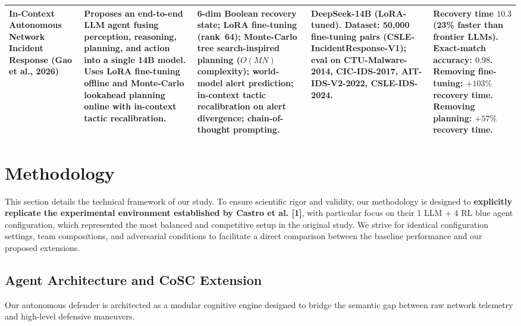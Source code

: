 \documentclass[letterpaper, 10 pt, conference]{ieeeconf}
\begin{document}
\begin{table}[!t]
{\begin{tabular}{|p{3.0cm}|p{4.2cm}|p{3.8cm}|p{3.8cm}|p{3.6cm}|}
    In-Context Autonomous Network Incident Response
    \newline (Gao et al., 2026)~\cite{arXiv:2602.13156}
    &
    Proposes an end-to-end LLM agent fusing perception,
    reasoning, planning, and action into a single 14B
    model. Uses LoRA fine-tuning offline and Monte-Carlo
    lookahead planning online with in-context tactic
    recalibration.
    &
    6-dim Boolean recovery state; LoRA fine-tuning
    (rank~64); Monte-Carlo tree search-inspired planning
    ($O(MN)$ complexity); world-model alert prediction;
    in-context tactic recalibration on alert divergence;
    chain-of-thought prompting.
    &
    DeepSeek-14B (LoRA-tuned).
    \newline
    \textbf{Dataset:} 50{,}000 fine-tuning pairs
    (CSLE-IncidentResponse-V1); eval on CTU-Malware-2014,
    CIC-IDS-2017, AIT-IDS-V2-2022, CSLE-IDS-2024.
    &
    Recovery time $10.3$ (23\% faster than frontier LLMs).
    Exact-match accuracy: $0.98$.
    Removing fine-tuning: $+103\%$ recovery time.
    Removing planning: $+57\%$ recovery time. \\
    \hline
 
  \end{tabular}%
  }
\end{table}

\section{Methodology}
This section details the technical framework of our study. To ensure scientific rigor and validity, our methodology is designed to \textbf{explicitly replicate the experimental environment established by Castro et al. [1]}, with particular focus on their 1 LLM + 4 RL blue agent configuration, which represented the most balanced and competitive setup in the original study. We strive for identical configuration settings, team compositions, and adversarial conditions to facilitate a direct comparison between the baseline performance and our proposed extensions.

\subsection{Agent Architecture and CoSC Extension}
Our autonomous defender is architected as a modular cognitive engine designed to bridge the semantic gap between raw network telemetry and high-level defensive maneuvers. 
\end{document}
